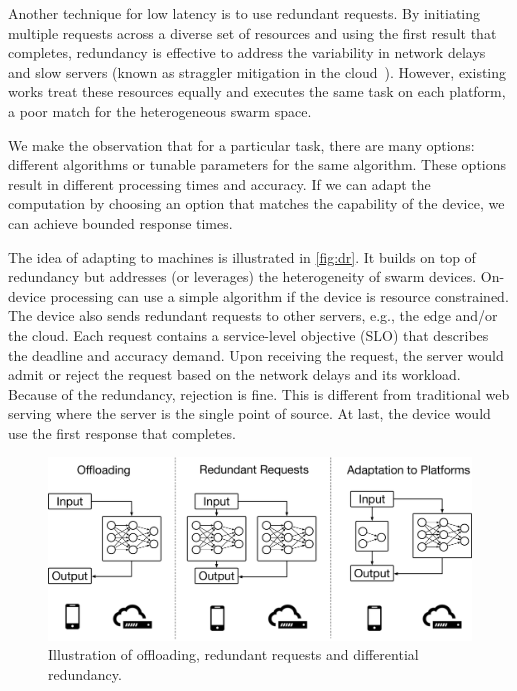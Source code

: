 Another technique for low latency is to use redundant requests. By initiating
multiple requests across a diverse set of resources and using the first result
that completes, redundancy is effective to address the variability in network
delays~\cite{gordon2015accelerating, vulimiri2013low} and slow servers (known as
straggler mitigation in the cloud~\cite{dean2013tail,
  ananthanarayanan2013effective}). However, existing works treat these resources
equally and executes the same task on each platform, a poor match for the
heterogeneous swarm space.

We make the observation that for a particular task, there are many options:
different algorithms or tunable parameters for the same algorithm. These options
result in different processing times and accuracy. If we can adapt the
computation by choosing an option that matches the capability of the device, we
can achieve bounded response times.

The idea of adapting to machines is illustrated in \autoref{fig:dr}. It builds
on top of redundancy but addresses (or leverages) the heterogeneity of swarm
devices.  On-device processing can use a simple algorithm if the device is
resource constrained. The device also sends redundant requests to other servers,
e.g., the edge and/or the cloud. Each request contains a service-level objective
(SLO) that describes the deadline and accuracy demand. Upon receiving the
request, the server would admit or reject the request based on the network
delays and its workload. Because of the redundancy, rejection is fine. This is
different from traditional web serving where the server is the single point of
source. At last, the device would use the first response that completes.

\begin{figure}
  \centering
  \includegraphics[width=0.8\columnwidth]{figures/dr.pdf}
  \caption{Illustration of offloading, redundant requests and differential
    redundancy.}
  \label{fig:dr}
\end{figure}


